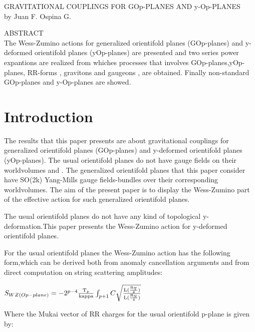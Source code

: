 \documentclass[a4paper,a4paper]{article}
\begin{document}
\begin{center}
GRAVITATIONAL COUPLINGS FOR GOp-PLANES AND y-Op-PLANES \\ [.25in]
by Juan F. Ospina G.
\end{center}
\begin{center}
ABSTRACT \\ [.25in]
The Wess-Zumino actions for generalized orientifold planes (GOp-planes) and y-deformed orientifold planes (yOp-planes) are presented and two series power expantions are realized from whiches processes that involves GOp-planes,yOp-planes, RR-forms , gravitons and gaugeons , are obtained. Finally non-standard GOp-planes and y-Op-planes are showed.
\end{center}

\section{Introduction}
The results that this paper presents are about gravitational couplings for generalized orientifold planes (GOp-planes) and y-deformed orientifold planes (yOp-planes). The usual orientifold planes do not have gauge fields on their worldvolumes and  . The generalized orientifold planes that this paper consider have SO(2k) Yang-Mills gauge fields-bundles over their corresponding worldvolumes. The aim of the present paper is to display the Wess-Zumino part of the effective action for such generalized orientifold planes.

The usual orientifold planes do not have any kind of topological y-deformation.This paper presents the Wess-Zumino action for  y-deformed orientifold planes.

For the usual orientifold planes the Wess-Zumino action has the following form,which can be derived both from anomaly cancellation arguments and from
direct computation on string scattering amplitudes:   

\begin{center}
{  $ S_{WZ(Op-plane)} = -2^{p-4}\frac{\rm T_p}{\rm kappa}\int_{p+1} C\sqrt{\frac{\rm L(\frac{\rm R_T}{\rm 4})}{\rm L(\frac{\rm R_N}{\rm 4})}}$ }
\end{center}

Where the Mukai vector of RR charges for the usual orientifold p-plane is given by:
\end{document}
